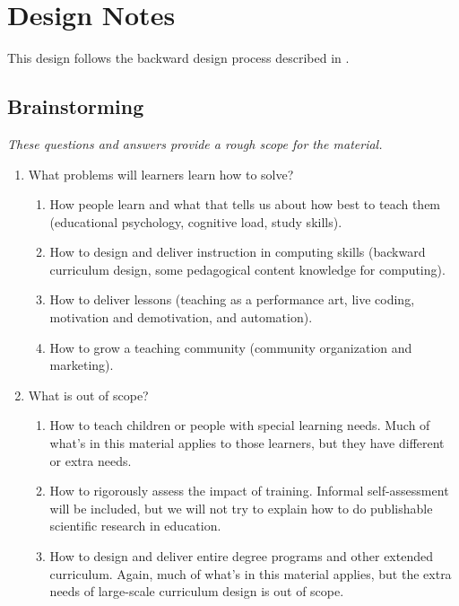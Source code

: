 \chapter{Design Notes}\label{s:v3}

This design follows the backward design process described in
.

\section*{Brainstorming}

\emph{These questions and answers provide a rough scope for the material.}

\begin{enumerate}

\item
  What problems will learners learn how to solve?
  \begin{enumerate}
  \item
    How people learn and what that tells us about how best to teach them
    (educational psychology, cognitive load, study skills).
  \item
    How to design and deliver instruction in computing skills
    (backward curriculum design, some pedagogical content knowledge for computing).
  \item
    How to deliver lessons
    (teaching as a performance art, live coding, motivation and demotivation, and automation).
  \item
    How to grow a teaching community
    (community organization and marketing).
  \end{enumerate}

\item
  What is out of scope?
  \begin{enumerate}
  \item
    How to teach children or people with special learning needs.  Much
    of what's in this material applies to those learners, but they
    have different or extra needs.
  \item
    How to rigorously assess the impact of training.  Informal
    self-assessment will be included, but we will not try to explain
    how to do publishable scientific research in education.
  \item
    How to design and deliver entire degree programs and other
    extended curriculum.  Again, much of what's in this material
    applies, but the extra needs of large-scale curriculum design is
    out of scope.
  \end{enumerate}


\end{enumerate}
